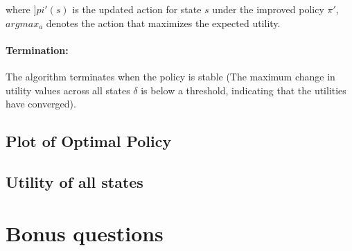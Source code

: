 \documentclass{article}
\begin{document}
where $]pi '(s)$ is the updated action for state $s$ under the improved policy $\pi '$, $argmax_a$ denotes the action that maximizes the expected utility.

\paragraph{Termination:} The algorithm terminates when the policy is stable (The maximum change in utility values across all states $\delta$ is below a threshold, indicating that the utilities have converged).

\subsection{Plot of Optimal Policy}

\subsection{Utility of all states}

\section{Bonus questions}
\end{document}
